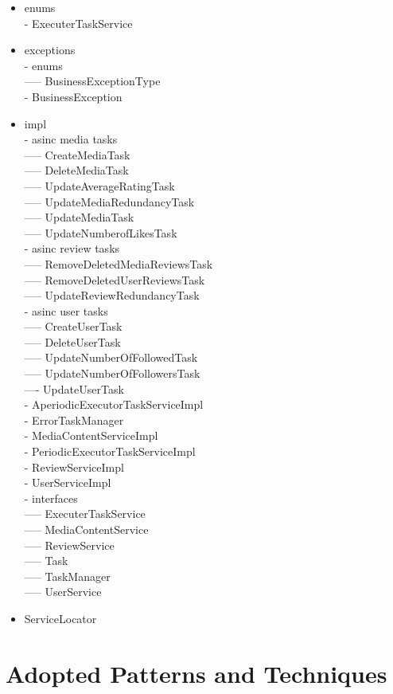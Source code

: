 \begin{itemize}
    \item enums \\
    - ExecuterTaskService
    \item exceptions \\
    - enums \\
    ----- BusinessExceptionType \\
    - BusinessException
    \item impl \\
    - asinc media tasks\\
    ----- CreateMediaTask\\
    ----- DeleteMediaTask\\
    ----- UpdateAverageRatingTask\\
    ----- UpdateMediaRedundancyTask\\
    ----- UpdateMediaTask\\
    ----- UpdateNumberofLikesTask\\
    - asinc review tasks\\
    ----- RemoveDeletedMediaReviewsTask\\
    ----- RemoveDeletedUserReviewsTask\\
    ----- UpdateReviewRedundancyTask\\
    - asinc user tasks\\
    ----- CreateUserTask\\
    ----- DeleteUserTask\\
    ----- UpdateNumberOfFollowedTask\\
    ----- UpdateNumberOfFollowersTask\\
    ---- UpdateUserTask\\
    - AperiodicExecutorTaskServiceImpl\\
    - ErrorTaskManager\\
    - MediaContentServiceImpl\\
    - PeriodicExecutorTaskServiceImpl\\
    - ReviewServiceImpl\\
    - UserServiceImpl\\
    - interfaces \\
    ----- ExecuterTaskService\\
    ----- MediaContentService\\
    ----- ReviewService\\
    ----- Task\\
    ----- TaskManager\\
    ----- UserService
    \item ServiceLocator
\end{itemize}


\section{Adopted Patterns and Techniques}

